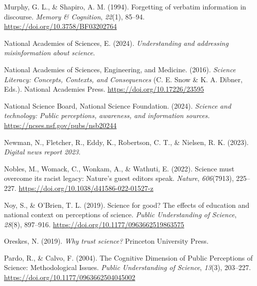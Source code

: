 \documentclass[
  jou,
  floatsintext,
  longtable,
  nolmodern,
  notxfonts,
  notimes,
  colorlinks=true,linkcolor=blue,citecolor=blue,urlcolor=blue]{apa7}
\newlength{\cslhangindent}
\newenvironment{CSLReferences}[2] %
 {\begin{list}{}{%
  \setlength{\itemindent}{0pt}
  \setlength{\leftmargin}{0pt}
  \setlength{\parsep}{0pt}
  \ifodd #1
   \setlength{\leftmargin}{\cslhangindent}
   \setlength{\itemindent}{-1\cslhangindent}
  \fi
  \setlength{\itemsep}{#2\baselineskip}}}
 {\end{list}}
\begin{document}
\begin{CSLReferences}{1}{0}
Murphy, G. L., \& Shapiro, A. M. (1994). Forgetting of verbatim
information in discourse. \emph{Memory \& Cognition}, \emph{22}(1),
85--94. \url{https://doi.org/10.3758/BF03202764}

National Academies of Sciences, E. (2024). \emph{Understanding and
addressing misinformation about science}.

National Academies of Sciences, Engineering, and Medicine. (2016).
\emph{Science Literacy: Concepts, Contexts, and Consequences} (C. E.
Snow \& K. A. Dibner, Eds.). National Academies Press.
\url{https://doi.org/10.17226/23595}

National Science Board, National Science Foundation. (2024).
\emph{Science and technology: Public perceptions, awareness, and
information sources.} \url{https://ncses.nsf.gov/pubs/nsb20244}

Newman, N., Fletcher, R., Eddy, K., Robertson, C. T., \& Nielsen, R. K.
(2023). \emph{Digital news report 2023}.

Nobles, M., Womack, C., Wonkam, A., \& Wathuti, E. (2022). Science must
overcome its racist legacy: Nature{'}s guest editors speak.
\emph{Nature}, \emph{606}(7913), 225--227.
\url{https://doi.org/10.1038/d41586-022-01527-z}

Noy, S., \& O'Brien, T. L. (2019). Science for good? The effects of
education and national context on perceptions of science. \emph{Public
Understanding of Science}, \emph{28}(8), 897--916.
\url{https://doi.org/10.1177/0963662519863575}

Oreskes, N. (2019). \emph{Why trust science?} Princeton University
Press.

Pardo, R., \& Calvo, F. (2004). The Cognitive Dimension of Public
Perceptions of Science: Methodological Issues. \emph{Public
Understanding of Science}, \emph{13}(3), 203--227.
\url{https://doi.org/10.1177/0963662504045002}


\end{CSLReferences}
\end{document}
